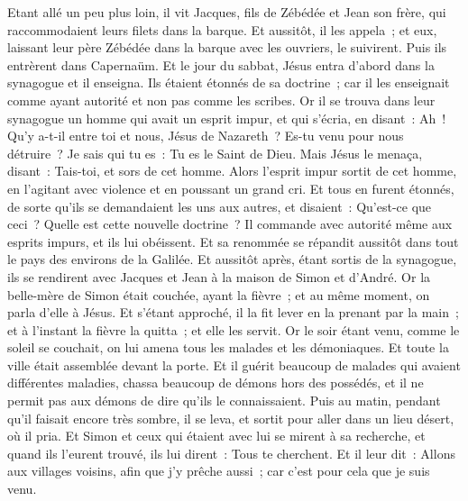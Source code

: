 \begin{multicols}{2}
Etant allé un peu plus loin, il vit Jacques, fils de Zébédée et Jean son frère, qui raccommodaient leurs filets dans la barque.
Et aussitôt, il les appela~; et eux, laissant leur père Zébédée dans la barque avec les ouvriers, le suivirent.
Puis ils entrèrent dans Capernaüm. Et le jour du sabbat, Jésus entra d'abord dans la synagogue et il enseigna.
Ils étaient étonnés de sa doctrine~; car il les enseignait comme ayant autorité et non pas comme les scribes.
Or il se trouva dans leur synagogue un homme qui avait un esprit impur, et qui s'écria,
en disant~: Ah~! Qu'y a-t-il entre toi et nous, Jésus de Nazareth~? Es-tu venu pour nous détruire~? Je sais qui tu es~: Tu es le Saint de Dieu.
Mais Jésus le menaça, disant~: Tais-toi, et sors de cet homme.
Alors l'esprit impur sortit de cet homme, en l'agitant avec violence et en poussant un grand cri.
Et tous en furent étonnés, de sorte qu'ils se demandaient les uns aux autres, et disaient~: Qu'est-ce que ceci~? Quelle est cette nouvelle doctrine~? Il commande avec autorité même aux esprits impurs, et ils lui obéissent.
Et sa renommée se répandit aussitôt dans tout le pays des environs de la Galilée.
Et aussitôt après, étant sortis de la synagogue, ils se rendirent avec Jacques et Jean à la maison de Simon et d'André.
Or la belle-mère de Simon était couchée, ayant la fièvre~; et au même moment, on parla d'elle à Jésus.
Et s'étant approché, il la fit lever en la prenant par la main~; et à l'instant la fièvre la quitta~; et elle les servit.
Or le soir étant venu, comme le soleil se couchait, on lui amena tous les malades et les démoniaques.
Et toute la ville était assemblée devant la porte.
Et il guérit beaucoup de malades qui avaient différentes maladies, chassa beaucoup de démons hors des possédés, et il ne permit pas aux démons de dire qu'ils le connaissaient.
Puis au matin, pendant qu'il faisait encore très sombre, il se leva, et sortit pour aller dans un lieu désert, où il pria.
Et Simon et ceux qui étaient avec lui se mirent à sa recherche,
et quand ils l'eurent trouvé, ils lui dirent~: Tous te cherchent.
Et il leur dit~: Allons aux villages voisins, afin que j'y prêche aussi~; car c'est pour cela que je suis venu.

\end{multicols}
